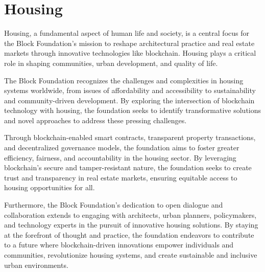 \newpage
\section{Housing}


Housing, a fundamental aspect of human life and society, is a central focus for the Block Foundation's mission to reshape architectural practice and real estate markets through innovative technologies like blockchain. Housing plays a critical role in shaping communities, urban development, and quality of life.

The Block Foundation recognizes the challenges and complexities in housing systems worldwide, from issues of affordability and accessibility to sustainability and community-driven development. By exploring the intersection of blockchain technology with housing, the foundation seeks to identify transformative solutions and novel approaches to address these pressing challenges.

Through blockchain-enabled smart contracts, transparent property transactions, and decentralized governance models, the foundation aims to foster greater efficiency, fairness, and accountability in the housing sector. By leveraging blockchain's secure and tamper-resistant nature, the foundation seeks to create trust and transparency in real estate markets, ensuring equitable access to housing opportunities for all.

Furthermore, the Block Foundation's dedication to open dialogue and collaboration extends to engaging with architects, urban planners, policymakers, and technology experts in the pursuit of innovative housing solutions. By staying at the forefront of thought and practice, the foundation endeavors to contribute to a future where blockchain-driven innovations empower individuals and communities, revolutionize housing systems, and create sustainable and inclusive urban environments.